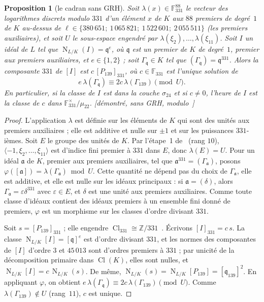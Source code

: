 \documentclass[11pt,a4paper]{amsart}
\theoremstyle{plain}
\newtheorem{proposition}{Proposition}[section]
\theoremstyle{definition}
\newcommand{\Z}{\mathbb{Z}}
\newcommand{\F}{\mathbb{F}}
\newcommand{\q}{\mathfrak{q}}
\DeclareMathOperator{\Nm}{N}
\DeclareMathOperator{\Cl}{Cl}
\newcommand{\st}[1]{\textup{\textsf{\small[#1]}}}
\begin{document}
\begin{proposition}[le cadran sans GRH]\label{prop:dial}
Soit $\lambda(x)\in\F_{331}^{88}$ le vecteur des logarithmes discrets modulo $331$ d'un élément $x$ de $K$ aux $88$ premiers de degré~$1$ de $K$ au-dessus de $\ell\in\{380\,651;\ 1\,065\,821;\ 1\,522\,601;\ 2\,055\,511\}$ (les premiers auxiliaires), et soit $U$ le sous-espace engendré par $\lambda(\xi_2),\dots,\lambda(\xi_{11})$. Soit $I$ un idéal de $L$ tel que $\Nm_{L/K}(I)=\q^e$, où $\q$ est un premier de $K$ de degré~$1$, premier aux premiers auxiliaires, et $e\in\{1,2\}$ ; soit $\Gamma_\q\in K$ tel que $(\Gamma_\q)=\q^{331}$. Alors la composante $331$ de $[I]$ est $c\,[P_{139}]_{331}$, où $c\in\F_{331}$ est l'unique solution de
\[
e\,\lambda(\Gamma_\q)\equiv2c\,\lambda(\Gamma_{139})\pmod U .
\]
En particulier, si la classe de $I$ est dans la couche $\sigma_{24}$ et si $c\ne0$, l'heure de $I$ est la classe de $c$ dans $\F_{331}^\times/\mu_{22}$. \st{démontré, sans GRH, modulo~\cite[prop.~2.2, 2.5]{Gau26}}
\end{proposition}

\begin{proof}
L'application $\lambda$ est définie sur les éléments de $K$ qui sont des unités aux premiers auxiliaires ; elle est additive et nulle sur $\pm1$ et sur les puissances $331$-ièmes. Soit $E$ le groupe des unités de $K$. Par l'étape~1 de~\cite[\S6.4]{Gau26} (rang $10$), $\langle-1,\xi_2,\dots,\xi_{11}\rangle$ est d'indice fini premier à $331$ dans $E$, donc $\lambda(E)=U$. Pour un idéal $\mathfrak a$ de $K$, premier aux premiers auxiliaires, tel que $\mathfrak a^{331}=(\Gamma_{\mathfrak a})$, posons $\varphi([\mathfrak a])=\lambda(\Gamma_{\mathfrak a})\bmod U$. Cette quantité ne dépend pas du choix de $\Gamma_{\mathfrak a}$, elle est additive, et elle est nulle sur les idéaux principaux : si $\mathfrak a=(\delta)$, alors $\Gamma_{\mathfrak a}=\varepsilon\delta^{331}$ avec $\varepsilon\in E$, et $\delta$ est une unité aux premiers auxiliaires. Comme toute classe d'idéaux contient des idéaux premiers à un ensemble fini donné de premiers, $\varphi$ est un morphisme sur les classes d'ordre divisant $331$.

Soit $s=[P_{139}]_{331}$ ; elle engendre $\Cl_{331}\cong\Z/331$~\cite[rem.~6.8(a)]{Gau26}. Écrivons $[I]_{331}=c\,s$. La classe $\Nm_{L/K}[I]=[\q]^e$ est d'ordre divisant $331$, et les normes des composantes de $[I]$ d'ordre $3$ et $45\,013$ sont d'ordres premiers à $331$ ; par unicité de la décomposition primaire dans $\Cl(K)$, elles sont nulles, et $\Nm_{L/K}[I]=c\,\Nm_{L/K}(s)$. De même, $\Nm_{L/K}(s)=\Nm_{L/K}[P_{139}]=[\q_{139}]^2$. En appliquant $\varphi$, on obtient $e\,\lambda(\Gamma_\q)\equiv2c\,\lambda(\Gamma_{139})\pmod U$. Comme $\lambda(\Gamma_{139})\notin U$ (rang~$11$), $c$ est unique.
\end{proof}
\end{document}
